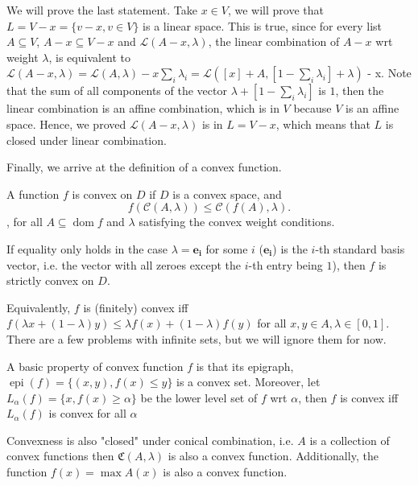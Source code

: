 We will prove the last statement. Take \( x \in V \), we will prove that \( L = V -
x = \{v - x, v \in V\}  \) is a linear space. This is true, since for every
list  \( A \subseteq V \), \( A - x \subseteq V - x \) and \( \mathcal{L}(A   -
x, \lambda) \), the linear combination of \( A-x \) wrt weight \( \lambda \),
is equivalent to \( \mathcal{L}(A-x, \lambda)  = \mathcal{L}(A, \lambda) - x
\sum_{i} \lambda_{i} = \mathcal{L}\left([x] + A, [1 - \sum_{i}
  \lambda_{i}] + \lambda\right)\) - x. Note that the sum of all components of the
  vector \(\lambda + [1 - \sum_{i} \lambda_{i}] \) is \( 1 \), then the linear
  combination is an affine combination, which is in \( V \) because \( V \) is an
  affine space. Hence, we proved \( \mathcal{L}(A-x, \lambda) \) is in \( L = V - x
  \), which means that \( L \) is closed under linear combination.


Finally, we arrive at the definition of a convex function.

\begin{definition}
  A function \( f \) is convex on \( D \) if \( D \) is a convex space, and
  \[
    f(\mathcal{C}(A, \lambda)) \le \mathcal{C}(f(A), \lambda)
  .\] , for all \( A \subseteq \operatorname{dom} f \) and \( \lambda \)
  satisfying the convex weight conditions.

  If equality only holds in the case \( \lambda = \mathbf{e_{i}} \) for some \(
  i\) (\( \mathbf{e_{i}} \)) is the \( i \)-th standard basis vector, i.e. the
  vector with all zeroes except the \( i \)-th entry being \( 1 \)), then \( f
  \) is strictly convex on \( D \).
\end{definition}

Equivalently, \( f \) is (finitely) convex iff \( f(\lambda x + (1-\lambda)y) \le \lambda
f(x) + (1 - \lambda)f(y) \) for all \( x, y \in A, \lambda \in [0, 1] \).
There are a few problems with infinite sets, but we
will ignore them for now.

A basic property of convex function \( f \) is that its epigraph, \(
\operatorname{epi}(f) = \{(x, y), f(x) \le  y\}   \) is a convex set. Moreover,
let \( L_{\alpha}(f)= \{x, f(x) \ge  \alpha\}   \) be the lower level set of \(
f\) wrt \( \alpha \), then \( f \) is convex iff \( L_{\alpha}(f) \) is convex
for all \( \alpha \)

Convexness is also "closed" under conical combination, i.e. \( A \) is a
collection of convex functions then \( \mathfrak{C}(A, \lambda) \) is also a
convex function. Additionally, the function \( f(x) = \max A(x) \) is also a
convex function.

